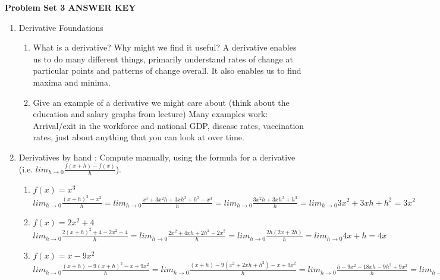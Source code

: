 \documentclass[11pt]{article}
\begin{document}
\noindent \textbf{Problem Set 3 \color{gray} ANSWER KEY} \color{black}

\begin{enumerate}

\item Derivative Foundations
\begin{enumerate}
\item What is a derivative? Why might we find it useful? \color{gray} A derivative enables us to do many different things, primarily understand rates of change at particular points and patterns of change overall. It also enables us to find maxima and minima. \color{black}
\item Give an example of a derivative we might care about (think about the education and salary graphs from lecture) \color{gray} Many examples work: Arrival/exit in the workforce and national GDP, disease rates, vaccination rates, just about anything that you can look at over time. \color{black}
\end{enumerate}

\item Derivatives by hand : Compute manually, using the formula for a derivative (i.e. $ lim_{h\rightarrow0}\frac{f(x+h)-f(x)}{h}$). 
\begin{enumerate}
\item $f(x)=x^3$ \\ 
\color{gray} $lim_{h\rightarrow0}\frac{(x+h)^3-x^3}{h}=lim_{h\rightarrow0}\frac{x^3+3x^2h+3xh^2+h^3-x^3}{h}=lim_{h\rightarrow0}\frac{3x^2h+3xh^2+h^3}{h}=lim_{h\rightarrow0}3x^2+3xh+h^2=3x^2$ \color{black}
\item  $f(x) =2x^2+4$ \\
\color{gray} $lim_{h\rightarrow0}\frac{2(x+h)^2 + 4 -2x^2 - 4}{h}=lim_{h\rightarrow0}\frac{2x^2+4xh+2h^2-2x^2}{h}=lim_{h\rightarrow0}\frac{2h(2x+2h)}{h}=lim_{h\rightarrow0}4x+h=4x$ \color{black}
\item  $f(x) =x-9x^2$ \\
\color{gray} $lim_{h\rightarrow0}\frac{(x+h)-9(x+h)^2-x+9x^2}{h}=lim_{h\rightarrow0}\frac{(x+h)-9(x^2+2xh+h^2)-x+9x^2}{h}=lim_{h\rightarrow0}\frac{h-9x^2-18xh-9h^2+9x^2}{h}=lim_{h\rightarrow0}\frac{h(1-18x-9h)}{h}=lim_{h\rightarrow0}(1-18x-9h)=1-18x$ \color{black}
\end{enumerate}



\end{enumerate}
\end{document}
